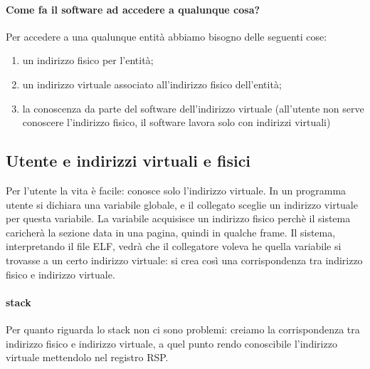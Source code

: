 \paragraph{Come fa il software ad accedere a qualunque cosa?} Per accedere a una qualunque entità abbiamo bisogno delle seguenti cose:
\begin{enumerate}
	\item un indirizzo fisico per l'entità;
	\item un indirizzo virtuale associato all'indirizzo fisico dell'entità;
	\item la conoscenza da parte del software dell'indirizzo virtuale (all'utente non serve conoscere l'indirizzo fisico, il software lavora solo con indirizzi virtuali)
\end{enumerate} 

\subsection{Utente e indirizzi virtuali e fisici}
Per l'utente la vita è facile: conosce solo l'indirizzo virtuale. In un programma utente si dichiara una variabile globale, e il collegato sceglie un indirizzo virtuale per questa variabile. La variabile acquisisce un indirizzo fisico perchè il sistema caricherà la sezione data in una pagina, quindi in qualche frame. Il sistema, interpretando il file ELF, vedrà che il collegatore voleva he quella variabile si trovasse a un certo indirizzo virtuale: si crea così una corrispondenza tra indirizzo fisico e indirizzo virtuale.


\paragraph{stack} Per quanto riguarda lo stack non ci sono problemi: creiamo la corrispondenza tra indirizzo fisico e indirizzo virtuale, a quel punto rendo conoscibile  l'indirizzo virtuale mettendolo  nel registro RSP.



